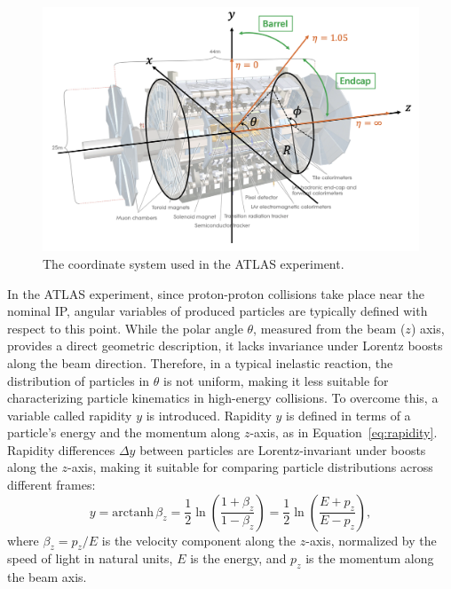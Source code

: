 \begin{figure}[htbp]
  \centering
  \includegraphics[width=1.0\textwidth]{figs/chapter2/ATLAS_coordinate_new.png}
  \caption{The coordinate system used in the ATLAS experiment.}
  \label{fig:ATLASCoordinate}
\end{figure}

In the ATLAS experiment, since proton-proton collisions take place near the nominal IP, angular variables of produced particles are typically defined with respect to this point. While the polar angle \(\theta\), measured from the beam (\(z\)) axis, provides a direct geometric description, it lacks invariance under Lorentz boosts along the beam direction. Therefore, in a typical inelastic reaction, the distribution of particles in \(\theta\) is not uniform, making it less suitable for characterizing particle kinematics in high-energy collisions.
To overcome this, a variable called rapidity \(y\) is introduced. Rapidity \(y\) is defined in terms of a particle's energy and the momentum along \(z\)-axis, as in Equation~\ref{eq:rapidity}. Rapidity differences \(\Delta y\) between particles are Lorentz-invariant under boosts along the \(z\)-axis, making it suitable for comparing particle distributions across different frames:
\begin{equation}
  y = \mathrm{arctanh}\, \beta_z 
    = \frac{1}{2} \ln \left( \frac{1 + \beta_z}{1 - \beta_z} \right)
    = \frac{1}{2} \ln \left( \frac{E + p_z}{E - p_z} \right),
  \label{eq:rapidity}
\end{equation}
where \(\beta_z = p_z/E\) is the velocity component along the \(z\)-axis, normalized by the speed of light in natural units, \(E\) is the energy, and \(p_z\) is the momentum along the beam axis.

